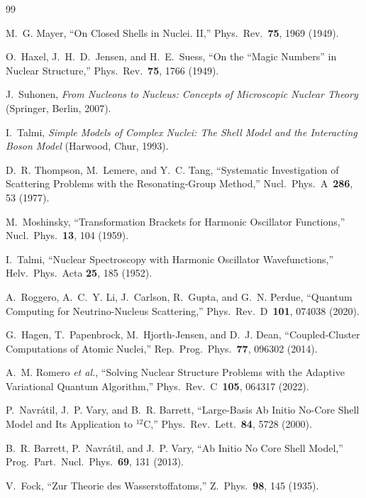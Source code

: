 \documentclass[twocolumn,prc,amsmath,amssymb,superscriptaddress]{revtex4-2}
\begin{document}
\begin{thebibliography}{99}

M.~G. Mayer,
``On Closed Shells in Nuclei. II,''
Phys.~Rev.~\textbf{75}, 1969 (1949).

O.~Haxel, J.~H.~D.~Jensen, and H.~E.~Suess,
``On the ``Magic Numbers'' in Nuclear Structure,''
Phys.~Rev.~\textbf{75}, 1766 (1949).

J.~Suhonen,
\emph{From Nucleons to Nucleus: Concepts of Microscopic Nuclear Theory}
(Springer, Berlin, 2007).

I.~Talmi,
\emph{Simple Models of Complex Nuclei: The Shell Model and the
Interacting Boson Model}
(Harwood, Chur, 1993).

D.~R. Thompson, M.~Lemere, and Y.~C. Tang,
``Systematic Investigation of Scattering Problems with the
Resonating-Group Method,''
Nucl.~Phys.~A~\textbf{286}, 53 (1977).

M.~Moshinsky,
``Transformation Brackets for Harmonic Oscillator Functions,''
Nucl.~Phys.~\textbf{13}, 104 (1959).

I.~Talmi,
``Nuclear Spectroscopy with Harmonic Oscillator Wavefunctions,''
Helv.~Phys.~Acta \textbf{25}, 185 (1952).

A.~Roggero, A.~C.~Y. Li, J.~Carlson, R.~Gupta, and G.~N. Perdue,
``Quantum Computing for Neutrino-Nucleus Scattering,''
Phys.~Rev.~D~\textbf{101}, 074038 (2020).

G.~Hagen, T.~Papenbrock, M.~Hjorth-Jensen, and D.~J. Dean,
``Coupled-Cluster Computations of Atomic Nuclei,''
Rep.~Prog.~Phys.~\textbf{77}, 096302 (2014).

A.~M. Romero \emph{et al.},
``Solving Nuclear Structure Problems with the Adaptive Variational
Quantum Algorithm,''
Phys.~Rev.~C~\textbf{105}, 064317 (2022).

P.~Navr\'atil, J.~P. Vary, and B.~R. Barrett,
``Large-Basis Ab Initio No-Core Shell Model and Its Application to
$^{12}$C,''
Phys.~Rev.~Lett.~\textbf{84}, 5728 (2000).

B.~R. Barrett, P.~Navr\'atil, and J.~P. Vary,
``Ab Initio No Core Shell Model,''
Prog.~Part.~Nucl.~Phys.~\textbf{69}, 131 (2013).

V.~Fock,
``Zur Theorie des Wasserstoffatoms,''
Z.~Phys.~\textbf{98}, 145 (1935).


\end{thebibliography}
\end{document}
